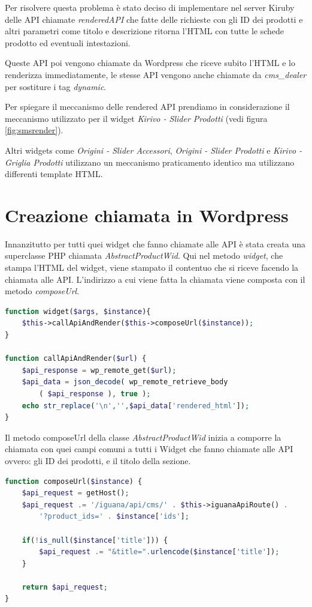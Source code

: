 Per risolvere questa problema è stato deciso di implementare nel server Kiruby delle API chiamate
\emph{renderedAPI} che fatte delle richieste con gli ID dei prodotti e altri parametri come titolo e descrizione
ritorna l'HTML con tutte le schede prodotto ed eventuali intestazioni.

Queste API poi vengono chiamate da Wordpress che riceve subito l'HTML e lo renderizza immediatamente,
le stesse API vengono anche chiamate da \emph{cms\_dealer} per sostiture i tag \emph{dynamic}.

Per spiegare il meccanismo delle rendered API prendiamo in considerazione il meccanismo utilizzato per il widget
\emph{Kirivo - Slider Prodotti} (vedi figura \ref{fig:smsrender}).

Altri widgets come \emph{Origini - Slider Accessori}, \emph{Origini - Slider Prodotti} e \emph{Kirivo - Griglia Prodotti}
utilizzano un meccanismo praticamento identico ma utilizzano differenti template HTML.

\section{Creazione chiamata in Wordpress}
Innanzitutto per tutti quei widget che fanno chiamate alle API è stata creata una superclasse PHP chiamata
\emph{AbstractProductWid}.
Qui nel metodo \emph{widget}, che stampa l'HTML del widget, viene stampato il contentuo che si riceve facendo la chiamata alle
API. L'indirizzo a cui viene fatta la chiamata viene composta con il metodo \emph{composeUrl}.

\begin{lstlisting}[style=customphp, language=Php,caption={I metodi widget e \emph{callApiAndRender} di \emph{AbstractProductWid}}] 
function widget($args, $instance){
	$this->callApiAndRender($this->composeUrl($instance));
}

function callApiAndRender($url) {
	$api_response = wp_remote_get($url);
	$api_data = json_decode( wp_remote_retrieve_body
		( $api_response ), true );
	echo str_replace('\n','',$api_data['rendered_html']);
}
\end{lstlisting}

Il metodo composeUrl della classe \emph{AbstractProductWid} inizia a comporre la chiamata con quei campi
comuni a tutti i Widget che fanno chiamate alle API ovvero: gli ID dei prodotti, e il titolo della sezione.

\begin{lstlisting}[style=customphp, language=Php,caption={Il metodo \emph{composeUrl} di \emph{AbstractProductWid}}] 
function composeUrl($instance) {
    $api_request = getHost();
    $api_request .= '/iguana/api/cms/' . $this->iguanaApiRoute() . 
    	'?product_ids=' . $instance['ids'];

    if(!is_null($instance['title'])) {
        $api_request .= "&title=".urlencode($instance['title']);
    }

    return $api_request;
}

\end{lstlisting}

